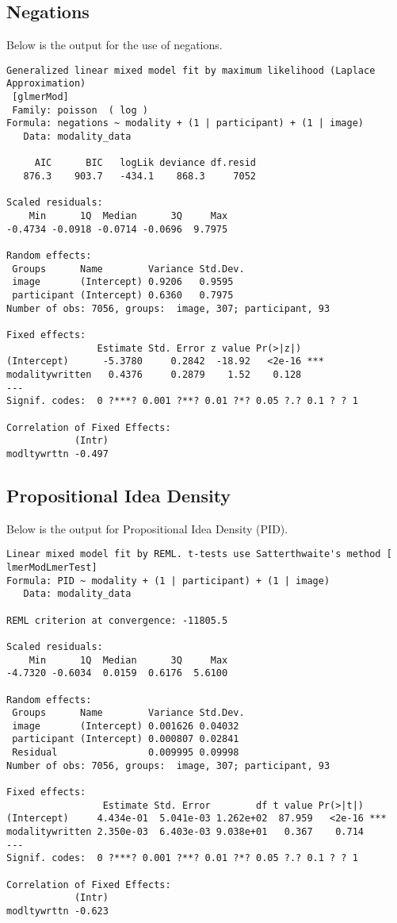 \documentclass[11pt]{article}
\begin{document}
\subsection{Negations}
Below is the output for the use of negations.
\begin{verbatim}
Generalized linear mixed model fit by maximum likelihood (Laplace  Approximation)
 [glmerMod]
 Family: poisson  ( log )
Formula: negations ~ modality + (1 | participant) + (1 | image)
   Data: modality_data

     AIC      BIC   logLik deviance df.resid 
   876.3    903.7   -434.1    868.3     7052 

Scaled residuals: 
    Min      1Q  Median      3Q     Max 
-0.4734 -0.0918 -0.0714 -0.0696  9.7975 

Random effects:
 Groups      Name        Variance Std.Dev.
 image       (Intercept) 0.9206   0.9595  
 participant (Intercept) 0.6360   0.7975  
Number of obs: 7056, groups:  image, 307; participant, 93

Fixed effects:
                Estimate Std. Error z value Pr(>|z|)    
(Intercept)      -5.3780     0.2842  -18.92   <2e-16 ***
modalitywritten   0.4376     0.2879    1.52    0.128    
---
Signif. codes:  0 ?***? 0.001 ?**? 0.01 ?*? 0.05 ?.? 0.1 ? ? 1

Correlation of Fixed Effects:
            (Intr)
modltywrttn -0.497
\end{verbatim}

\subsection{Propositional Idea Density}
Below is the output for Propositional Idea Density (PID).
\begin{verbatim}
Linear mixed model fit by REML. t-tests use Satterthwaite's method [
lmerModLmerTest]
Formula: PID ~ modality + (1 | participant) + (1 | image)
   Data: modality_data

REML criterion at convergence: -11805.5

Scaled residuals: 
    Min      1Q  Median      3Q     Max 
-4.7320 -0.6034  0.0159  0.6176  5.6100 

Random effects:
 Groups      Name        Variance Std.Dev.
 image       (Intercept) 0.001626 0.04032 
 participant (Intercept) 0.000807 0.02841 
 Residual                0.009995 0.09998 
Number of obs: 7056, groups:  image, 307; participant, 93

Fixed effects:
                 Estimate Std. Error        df t value Pr(>|t|)    
(Intercept)     4.434e-01  5.041e-03 1.262e+02  87.959   <2e-16 ***
modalitywritten 2.350e-03  6.403e-03 9.038e+01   0.367    0.714    
---
Signif. codes:  0 ?***? 0.001 ?**? 0.01 ?*? 0.05 ?.? 0.1 ? ? 1

Correlation of Fixed Effects:
            (Intr)
modltywrttn -0.623
\end{verbatim}
\end{document}
